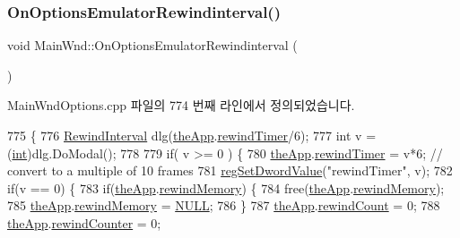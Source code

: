 \subsubsection{\texorpdfstring{On\+Options\+Emulator\+Rewindinterval()}{OnOptionsEmulatorRewindinterval()}}
{\footnotesize\ttfamily void Main\+Wnd\+::\+On\+Options\+Emulator\+Rewindinterval (\begin{DoxyParamCaption}{ }\end{DoxyParamCaption})\hspace{0.3cm}{\ttfamily [protected]}}



Main\+Wnd\+Options.\+cpp 파일의 774 번째 라인에서 정의되었습니다.


\begin{DoxyCode}
775 \{
776     \mbox{\hyperlink{class_rewind_interval}{RewindInterval}} dlg(\mbox{\hyperlink{_v_b_a_8cpp_a8095a9d06b37a7efe3723f3218ad8fb3}{theApp}}.\mbox{\hyperlink{class_v_b_a_a682a6a9633f41038b23a2bdcdbde844e}{rewindTimer}}/6);
777     \textcolor{keywordtype}{int} v = (\mbox{\hyperlink{_util_8cpp_a0ef32aa8672df19503a49fab2d0c8071}{int}})dlg.DoModal();
778     
779     \textcolor{keywordflow}{if}( v >= 0 ) \{
780         \mbox{\hyperlink{_v_b_a_8cpp_a8095a9d06b37a7efe3723f3218ad8fb3}{theApp}}.\mbox{\hyperlink{class_v_b_a_a682a6a9633f41038b23a2bdcdbde844e}{rewindTimer}} = v*6; \textcolor{comment}{// convert to a multiple of 10 frames}
781         \mbox{\hyperlink{_reg_8cpp_a758e775489a3fb5c3cc7071fdd5af87e}{regSetDwordValue}}(\textcolor{stringliteral}{"rewindTimer"}, v);
782         \textcolor{keywordflow}{if}(v == 0) \{
783             \textcolor{keywordflow}{if}(\mbox{\hyperlink{_v_b_a_8cpp_a8095a9d06b37a7efe3723f3218ad8fb3}{theApp}}.\mbox{\hyperlink{class_v_b_a_ad2f4e21586cc185a1e6525080532471a}{rewindMemory}}) \{
784                 free(\mbox{\hyperlink{_v_b_a_8cpp_a8095a9d06b37a7efe3723f3218ad8fb3}{theApp}}.\mbox{\hyperlink{class_v_b_a_ad2f4e21586cc185a1e6525080532471a}{rewindMemory}});
785                 \mbox{\hyperlink{_v_b_a_8cpp_a8095a9d06b37a7efe3723f3218ad8fb3}{theApp}}.\mbox{\hyperlink{class_v_b_a_ad2f4e21586cc185a1e6525080532471a}{rewindMemory}} = \mbox{\hyperlink{getopt1_8c_a070d2ce7b6bb7e5c05602aa8c308d0c4}{NULL}};
786             \}
787             \mbox{\hyperlink{_v_b_a_8cpp_a8095a9d06b37a7efe3723f3218ad8fb3}{theApp}}.\mbox{\hyperlink{class_v_b_a_a39430ba84d3e7205846e24f0484d7880}{rewindCount}} = 0;
788             \mbox{\hyperlink{_v_b_a_8cpp_a8095a9d06b37a7efe3723f3218ad8fb3}{theApp}}.\mbox{\hyperlink{class_v_b_a_a63a3cf03d4213b2596b59226134b0d5b}{rewindCounter}} = 0;

\end{DoxyCode}
